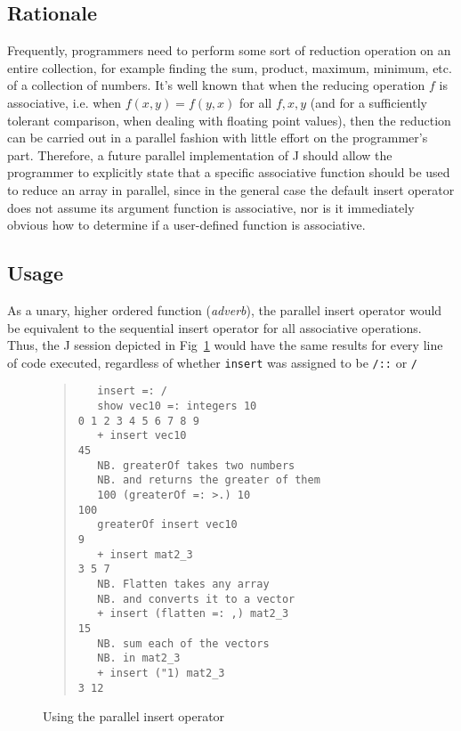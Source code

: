 \subsection{Rationale}
Frequently, programmers need to perform some sort of reduction operation on an entire collection, 
for example finding the sum, product, maximum, minimum, etc. of a collection of numbers.
It's well known that when the reducing operation $f$ is associative, 
i.e. when $f(x,y) = f(y,x)$ for all $f, x, y$ (and for a sufficiently tolerant comparison, when dealing with floating point values),
then the reduction can be carried out in a parallel fashion with little effort on the programmer's part.
Therefore, a future parallel implementation of J should allow the programmer 
to explicitly state that a specific associative function should be used to reduce an array in parallel, 
since in the general case the default insert operator does not assume its argument function is associative, 
nor is it immediately obvious how to determine if a user-defined function is associative.

\subsection{Usage}
As a unary, higher ordered function (\textit{adverb}), 
the parallel insert operator would be equivalent to the sequential insert operator 
for all associative operations. 
Thus, the J session depicted in Fig~\ref{fig::pinsert} would have the same results for every line of code executed, 
regardless of whether \texttt{insert} was assigned to be \texttt{/::} or \texttt{/}

\begin{figure}[h]
\begin{quote}
\begin{singlespacing}
\begin{small}
\begin{verbatim}
   insert =: /
   show vec10 =: integers 10
0 1 2 3 4 5 6 7 8 9
   + insert vec10
45
   NB. greaterOf takes two numbers
   NB. and returns the greater of them
   100 (greaterOf =: >.) 10
100
   greaterOf insert vec10
9
   + insert mat2_3
3 5 7
   NB. Flatten takes any array
   NB. and converts it to a vector
   + insert (flatten =: ,) mat2_3
15
   NB. sum each of the vectors
   NB. in mat2_3
   + insert ("1) mat2_3
3 12
\end{verbatim}
\end{small}
\end{singlespacing}
\end{quote}
\caption{Using the parallel insert operator}
\label{fig::pinsert}
\end{figure}


